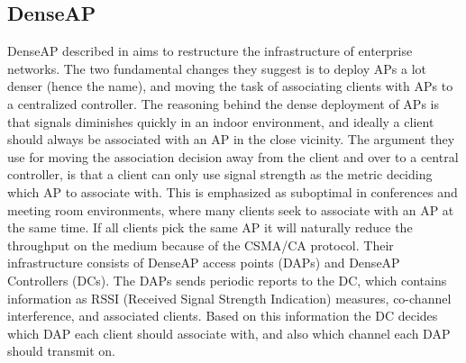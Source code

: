 \subsection{DenseAP}
DenseAP described in \cite{Murty2} aims to restructure the infrastructure of enterprise networks.  The two fundamental
changes they suggest is to deploy APs a lot denser (hence the name), and moving the task of associating clients
with APs to a centralized controller. The reasoning behind the dense deployment of APs is that signals diminishes
quickly in an indoor environment, and ideally a client should always be associated with an AP in the close vicinity. The argument 
they use for moving the association decision away from the client and over to a central controller, is that a client can
only use signal strength as the metric deciding which AP to associate with. This is emphasized as
suboptimal in conferences and meeting room environments, where many clients seek to associate with an AP at the same time.
If all clients pick the same AP it will naturally reduce the throughput on the medium because of the CSMA/CA protocol. 
Their infrastructure consists of DenseAP access points (DAPs) and DenseAP Controllers (DCs). The DAPs sends periodic
reports to the DC, which contains information as RSSI (Received Signal Strength Indication) measures, co-channel interference, and associated clients. Based on this
information the DC decides which DAP each client should associate with, and also which channel each DAP should transmit
on. 

